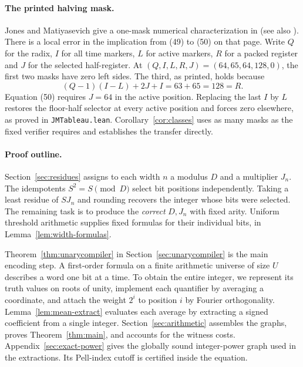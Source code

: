 \documentclass[11pt,letterpaper]{article}
\numberwithin{equation}{section}
\begin{document}
\paragraph{The printed halving mask.}
Jones and Matiyasevich give a one-mask numerical characterization in \cite[Section~5, eq.~(53), p.~827]{jm} (see also \cite[Section~4.3]{lipmaa}). There is a local error in the implication from (49) to (50) on that page. Write $Q$ for the radix, $I$ for all time markers, $L$ for active markers, $R$ for a packed register and $J$ for the selected half-register. At $(Q,I,L,R,J)=(64,65,64,128,0)$, the first two masks have zero left sides. The third, as printed, holds because
\[
   (Q-1)(I-L)+2J+I=63+65=128=R.
\]
Equation (50) requires $J=64$ in the active position. Replacing the last $I$ by $L$ restores the floor-half selector at every active position and forces zero elsewhere, as proved in \texttt{JMTableau.lean}. Corollary~\ref{cor:classes} uses as many masks as the fixed verifier requires and establishes the transfer directly.

\paragraph{Proof outline.}
Section~\ref{sec:residues} assigns to each width $n$ a modulus $D$ and a multiplier $J_n$. The idempotents $S^2=S\pmod D$ select bit positions independently. Taking a least residue of $SJ_n$ and rounding recovers the integer whose bits were selected. The remaining task is to produce the \emph{correct} $D,J_n$ with fixed arity. Uniform threshold arithmetic supplies fixed formulas for their individual bits, in Lemma~\ref{lem:width-formulas}.

Theorem~\ref{thm:unarycompiler} in Section~\ref{sec:unarycompiler} is the main encoding step. A first-order formula on a finite arithmetic universe of size $U$ describes a word one bit at a time. To obtain the entire integer, we represent its truth values on roots of unity, implement each quantifier by averaging a coordinate, and attach the weight $2^i$ to position $i$ by Fourier orthogonality. Lemma~\ref{lem:mean-extract} evaluates each average by extracting a signed coefficient from a single integer. Section~\ref{sec:arithmetic} assembles the graphs, proves Theorem~\ref{thm:main}, and accounts for the witness costs. Appendix~\ref{sec:exact-power} gives the globally sound integer-power graph used in the extractions. Its Pell-index cutoff is certified inside the equation.
\end{document}

